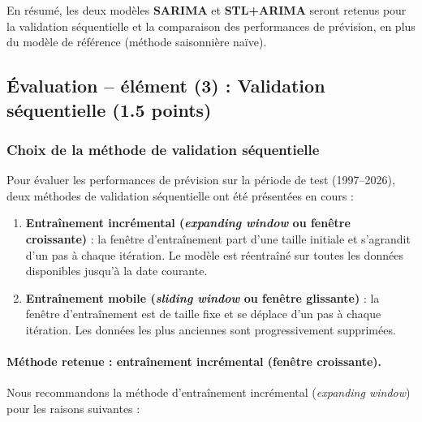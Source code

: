 \documentclass[12pt,a4paper]{article}
\begin{document}
En résumé, les deux modèles \textbf{SARIMA} et \textbf{STL+ARIMA} seront retenus pour la validation séquentielle et la comparaison des performances de prévision, en plus du modèle de référence (méthode saisonnière naïve).

\subsection{Évaluation – élément (3) : Validation séquentielle (1.5 points)}

\subsubsection{Choix de la méthode de validation séquentielle}

Pour évaluer les performances de prévision sur la période de test (1997--2026), deux méthodes de validation séquentielle ont été présentées en cours :

\begin{enumerate}
    \item \textbf{Entraînement incrémental (\textit{expanding window} ou fenêtre croissante)} : la fenêtre d'entraînement part d'une taille initiale et s'agrandit d'un pas à chaque itération. Le modèle est réentraîné sur toutes les données disponibles jusqu'à la date courante.
    \item \textbf{Entraînement mobile (\textit{sliding window} ou fenêtre glissante)} : la fenêtre d'entraînement est de taille fixe et se déplace d'un pas à chaque itération. Les données les plus anciennes sont progressivement supprimées.
\end{enumerate}

\paragraph{Méthode retenue : entraînement incrémental (fenêtre croissante).}

Nous recommandons la méthode d'entraînement incrémental (\textit{expanding window}) pour les raisons suivantes :
\end{document}
